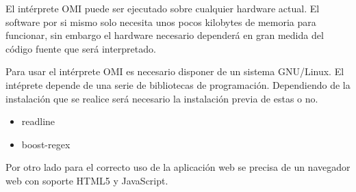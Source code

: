 El intérprete OMI puede ser ejecutado sobre cualquier hardware actual. El software por si mismo
solo necesita unos pocos kilobytes de memoria para funcionar, sin embargo el hardware 
necesario dependerá en gran medida del código fuente que será interpretado.

Para usar el intérprete OMI es necesario disponer de un sistema GNU/Linux. 
El intéprete depende de una serie de bibliotecas de programación. Dependiendo 
de la instalación que se realice será necesario la instalación previa de estas o no.

\begin{itemize}
\item readline
\item boost-regex
\end{itemize}

Por otro lado para el correcto uso de la aplicación web se precisa de un navegador web con soporte 
HTML5 y JavaScript.
